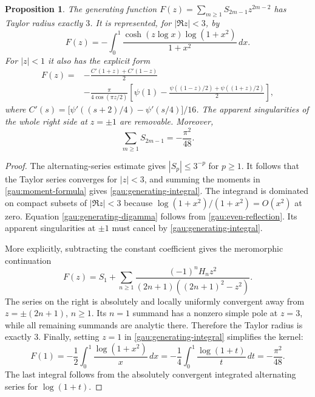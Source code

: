 \documentclass[11pt,a4paper]{article}
\newtheorem{proposition}[theorem]{Proposition}
\theoremstyle{definition}
\theoremstyle{remark}
\numberwithin{equation}{section}
\begin{document}
\begin{proposition}\label{gau:generating}
The generating function
$F(z)=\sum_{m\geq1}S_{2m-1}z^{2m-2}$ has Taylor radius exactly $3$.
It is represented, for $|\Re z|<3$, by
\begin{equation}\label{gau:generating-integral}
 F(z)=-\int_0^1\frac{\cosh(z\log x)\log(1+x^2)}{1+x^2}\,dx.
\end{equation}
For $|z|<1$ it also has the explicit form
\begin{equation}\label{gau:generating-digamma}
\begin{split}
 F(z)={}&-\frac{C'(1+z)+C'(1-z)}2\\
 &-\frac{\pi}{4\cos(\pi z/2)}
 \left[\psi(1)-\frac{\psi((1-z)/2)+\psi((1+z)/2)}2\right],
\end{split}
\end{equation}
where
$C'(s)=\bigl[\psi'((s+2)/4)-\psi'(s/4)\bigr]/16$.
The apparent singularities of the whole right side at $z=\pm1$ are removable.
Moreover,
\begin{equation}\label{gau:resummation}
 \boxed{\displaystyle\sum_{m\geq1}S_{2m-1}=-\frac{\pi^2}{48}.}
\end{equation}
\end{proposition}
\begin{proof}
The alternating-series estimate gives $|S_p|\leq3^{-p}$ for $p\geq1$.
It follows that the Taylor series converges for $|z|<3$, and summing the
moments in \eqref{gau:moment-formula} gives
\eqref{gau:generating-integral}. The integrand is dominated on compact
subsets of $|\Re z|<3$ because $\log(1+x^2)/(1+x^2)=O(x^2)$ at zero.
Equation \eqref{gau:generating-digamma} follows from
\eqref{gau:even-reflection}. Its apparent singularities at $\pm1$ must
cancel by \eqref{gau:generating-integral}.

More explicitly, subtracting the constant coefficient gives the meromorphic
continuation
\begin{equation}\label{gau:partial-fractions}
 F(z)=S_1+\sum_{n\geq1}
 \frac{(-1)^nH_n z^2}{(2n+1)((2n+1)^2-z^2)}.
\end{equation}
The series on the right is absolutely and locally uniformly convergent
away from $z=\pm(2n+1)$, $n\geq1$. Its $n=1$ summand has a nonzero simple
pole at $z=3$, while all remaining summands are analytic there. Therefore
the Taylor radius is exactly $3$.
Finally, setting $z=1$ in \eqref{gau:generating-integral} simplifies the
kernel:
\[
 F(1)=-\frac12\int_0^1\frac{\log(1+x^2)}x\,dx
      =-\frac14\int_0^1\frac{\log(1+t)}t\,dt
      =-\frac{\pi^2}{48}.
\]
The last integral follows from the absolutely convergent integrated
alternating series for $\log(1+t)$.
\end{proof}
\end{document}
